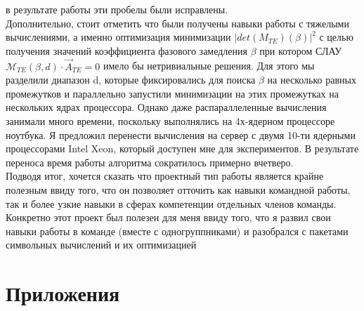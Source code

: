 \documentclass{article}
\begin{document}
в результате работы эти пробелы были исправлены.\\[10pt]
Дополнительно, стоит отметить что были получены навыки работы с тяжелыми вычислениями, а именно
оптимизация минимизации $|det(M_{TE})(\beta)|^2$
с целью получения значений коэффициента фазового замедления
$\beta$ при котором СЛАУ $\mathcal{M}_{TE}(\beta, d) \cdot \vec{A}_{TE} = 0$ имело бы нетривиальные решения. Для этого мы разделили диапазон d, которые
фиксировались для поиска $\beta$ на несколько равных промежутков и параллельно запустили минимизации на
этих промежутках на нескольких ядрах процессора. Однако даже распараллеленные вычисления занимали
много времени, поскольку выполнялись на 4х-ядерном процессоре ноутбука. Я предложил перенести вычисления на сервер с двумя 10-ти ядерными процессорами Intel Xeon, который доступен мне для экспериментов.
В результате переноса время работы алгоритма сократилось примерно вчетверо.\\[10pt]
Подводя итог, хочется сказать что проектный тип работы является крайне полезным ввиду того, что
он позволяет отточить как навыки командной работы, так и более узкие навыки в сферах компетенции
отдельных членов команды. Конкретно этот проект был полезен для меня ввиду того, что я развил свои
навыки работы в команде (вместе с одногруппниками) и разобрался с пакетами символьных вычислений и
их оптимизацией




\newpage




\newpage

\section*{Приложения}
\end{document}
